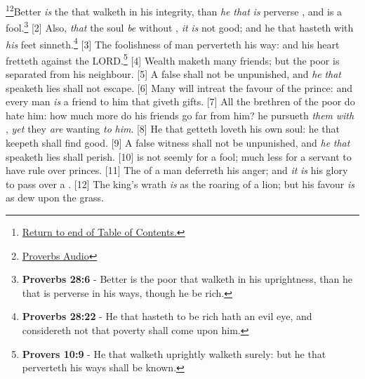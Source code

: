 \footnote{\textcolor[cmyk]{0.99998,1,0,0}{\hyperlink{TOC}{Return to end of Table of Contents.}}}\footnote{\href{https://www.audioverse.org/english/audiobibles/books/ENGKJV/O/Prov/1}{\textcolor[cmyk]{0.99998,1,0,0}{Proverbs Audio}}}\textcolor[cmyk]{0.99998,1,0,0}{Better \emph{is} the  that walketh in his integrity, than \emph{he} \emph{that} \emph{is} perverse , and is a fool.}\footnote{\textbf{Proverbs 28:6} - Better is the poor that walketh in his uprightness, than he that is perverse in his ways, though he be rich.} 
[2] \textcolor[cmyk]{0.99998,1,0,0}{Also, \emph{that} the soul \emph{be} without , \emph{it} \emph{is} not good; and he that hasteth with \emph{his} feet sinneth.}\footnote{\textbf{Proverbs 28:22} - He that hasteth to be rich hath an evil eye, and considereth not that poverty shall come upon him.} 
[3] \textcolor[cmyk]{0.99998,1,0,0}{The foolishness of man perverteth his way: and his heart fretteth against the LORD.}\footnote{\textbf{Provers 10:9} - He that walketh uprightly walketh surely: but he that perverteth his ways shall be known.} 
[4] \textcolor[cmyk]{0.99998,1,0,0}{Wealth maketh many friends; but the poor is separated from his neighbour.}
[5] \textcolor[cmyk]{0.99998,1,0,0}{A false  shall not be unpunished, and \emph{he} \emph{that} speaketh lies shall not escape.}
[6] \textcolor[cmyk]{0.99998,1,0,0}{Many will intreat the favour of the prince: and every man \emph{is} a friend to him that giveth gifts.}
[7] \textcolor[cmyk]{0.99998,1,0,0}{All the brethren of the poor do hate him: how much more do his friends go far from him? he pursueth \emph{them} \emph{with} , \emph{yet} they \emph{are} wanting \emph{to} \emph{him}.}
[8] \textcolor[cmyk]{0.99998,1,0,0}{He that getteth  loveth his own soul: he that keepeth  shall find good.}
[9] \textcolor[cmyk]{0.99998,1,0,0}{A false witness shall not be unpunished, and \emph{he} \emph{that} speaketh lies shall perish.}
[10] \textcolor[cmyk]{0.99998,1,0,0}{ is not seemly for a fool; much less for a servant to have rule over princes.}
[11] \textcolor[cmyk]{0.99998,1,0,0}{The  of a man deferreth his anger; and \emph{it} \emph{is} his glory to pass over a .}
[12] \textcolor[cmyk]{0.99998,1,0,0}{The king's wrath \emph{is} as the roaring of a lion; but his favour \emph{is} as dew upon the grass.}
